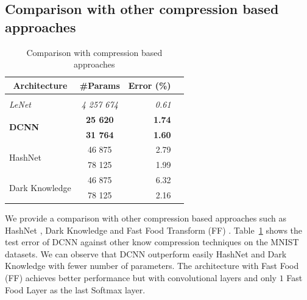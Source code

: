 \subsection{Comparison with other compression based approaches}
\label{subsection:p1-ch4-comparison_with_other_compression_based_approaches}


\begin{table}
  \centering
    \caption{Comparison with compression based approaches}
    \begin{tabular}{lcrc}
    \toprule
    \multicolumn{1}{c}{\textbf{Architecture}} & \multicolumn{1}{c}{\textbf{\#Params}} & \textbf{Error (\%)} \\
    \hline \\
    \textit{LeNet \cite{Lecun98gradient-basedlearning}} & \textit{4 257 674} & \textit{0.61} \\
    \multirow{2}[0]{*}{\textbf{DCNN}} & \textbf{25 620} & \textbf{1.74} \\
          & \textbf{31 764} & \textbf{1.60} \\
    \multirow{2}[0]{*}{HashNet \cite{chen2015compressing}} & 46 875 & 2.79 \\
          &  78 125 & 1.99 \\
    \multirow{2}[0]{*}{Dark Knowledge \cite{hinton2015distilling}} & 46 875 & 6.32 \\
          &  78 125 & 2.16 \\
    \bottomrule
    \end{tabular}%
  \label{tab:mnist}%
\end{table}%


We provide a comparison with other compression based approaches such as HashNet \cite{chen2015compressing}, Dark Knowledge \cite{hinton2015distilling} and Fast Food Transform (FF) \cite{yang2015deep}. 
Table~\ref{tab:mnist} shows the test error of DCNN against other know compression techniques on the MNIST datasets. We can observe that DCNN outperform easily HashNet \cite{chen2015compressing} and Dark Knowledge \cite{hinton2015distilling} with fewer number of parameters. The architecture with Fast Food (FF) \cite{yang2015deep} achieves better performance but with convolutional layers and only $1$ Fast Food Layer as the last Softmax layer. 


